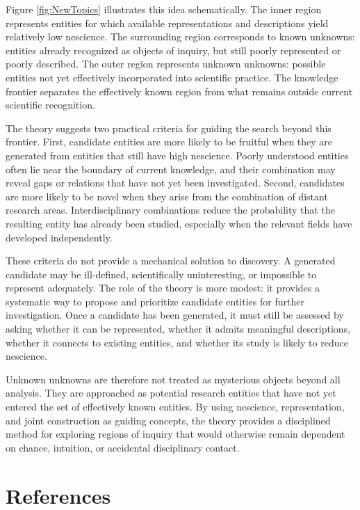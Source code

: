 Figure \ref{fig:NewTopics} illustrates this idea schematically. The inner region represents entities for which available representations and descriptions yield relatively low nescience. The surrounding region corresponds to known unknowns: entities already recognized as objects of inquiry, but still poorly represented or poorly described. The outer region represents unknown unknowns: possible entities not yet effectively incorporated into scientific practice. The knowledge frontier separates the effectively known region from what remains outside current scientific recognition.

The theory suggests two practical criteria for guiding the search beyond this frontier. First, candidate entities are more likely to be fruitful when they are generated from entities that still have high nescience. Poorly understood entities often lie near the boundary of current knowledge, and their combination may reveal gaps or relations that have not yet been investigated. Second, candidates are more likely to be novel when they arise from the combination of distant research areas. Interdisciplinary combinations reduce the probability that the resulting entity has already been studied, especially when the relevant fields have developed independently.

These criteria do not provide a mechanical solution to discovery. A generated candidate may be ill-defined, scientifically uninteresting, or impossible to represent adequately. The role of the theory is more modest: it provides a systematic way to propose and prioritize candidate entities for further investigation. Once a candidate has been generated, it must still be assessed by asking whether it can be represented, whether it admits meaningful descriptions, whether it connects to existing entities, and whether its study is likely to reduce nescience.

Unknown unknowns are therefore not treated as mysterious objects beyond all analysis. They are approached as potential research entities that have not yet entered the set of effectively known entities. By using nescience, representation, and joint construction as guiding concepts, the theory provides a disciplined method for exploring regions of inquiry that would otherwise remain dependent on chance, intuition, or accidental disciplinary contact.

%
%

\section*{References}

